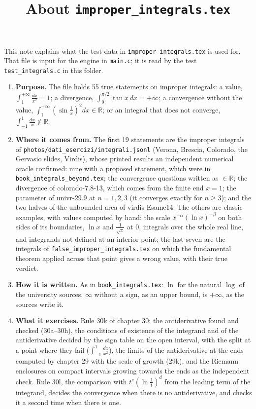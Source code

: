 \documentclass[11pt,a4paper]{article}
\title{About \texttt{improper\_integrals.tex}}
\author{}
\date{}
\begin{document}
\maketitle
This note explains what the test data in \texttt{improper\_integrals.tex} is used for. That file is input for the engine in \texttt{main.c}; it is read by the test \texttt{test\_integrals.c} in this folder.

\begin{enumerate}
\item \textbf{Purpose.} The file holds 55 true statements on improper integrals: a value, $\int_{1}^{+\infty} \frac{dx}{x^{2}} = 1$; a divergence, $\int_{0}^{\pi/2} \tan x \, dx = +\infty$; a convergence without the value, $\int_{1}^{+\infty} \left(\sin\frac{1}{x}\right)^{2} dx \in \mathbb{R}$; or an integral that does not converge, $\int_{-1}^{1} \frac{dx}{x} \notin \mathbb{R}$.

\item \textbf{Where it comes from.} The first 19 statements are the improper integrals of \texttt{photos/dati\_esercizi/integrali.jsonl} (Verona, Brescia, Colorado, the Gervasio slides, Virdis), whose printed results an independent numerical oracle confirmed: nine with a proposed statement, which were in \texttt{book\_integrals\_beyond.tex}; the convergence questions written as $\in \mathbb{R}$; the divergence of colorado-7.8-13, which comes from the finite end $x = 1$; the parameter of univr-29.9 at $n = 1, 2, 3$ (it converges exactly for $n \ge 3$); and the two halves of the unbounded area of virdis-Esame14. The others are classic examples, with values computed by hand: the scale $x^{-\alpha} (\ln x)^{-\beta}$ on both sides of its boundaries, $\ln x$ and $\frac{1}{\sqrt{x}}$ at $0$, integrals over the whole real line, and integrands not defined at an interior point; the last seven are the integrals of \texttt{false\_improper\_integrals.tex} on which the fundamental theorem applied across that point gives a wrong value, with their true verdict.

\item \textbf{How it is written.} As in \texttt{book\_integrals.tex}: $\ln$ for the natural $\log$ of the university sources. $\infty$ without a sign, as an upper bound, is $+\infty$, as the sources write it.

\item \textbf{What it exercises.} Rule 30k of chapter 30: the antiderivative found and checked (30a--30h), the conditions of existence of the integrand and of the antiderivative decided by the sign table on the open interval, with the split at a point where they fail ($\int_{-1}^{1} \frac{dx}{x^{2}}$), the limits of the antiderivative at the ends computed by chapter 29 with the scale of growth (29k), and the Riemann enclosures on compact intervals growing towards the ends as the independent check. Rule 30l, the comparison with $t^{e} \left(\ln\frac{1}{t}\right)^{d}$ from the leading term of the integrand, decides the convergence when there is no antiderivative, and checks it a second time when there is one.


\end{enumerate}
\end{document}
